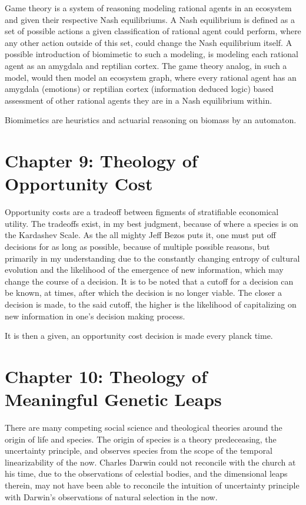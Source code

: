 \documentclass[ebook,12pt,oneside,openany]{memoir}
\begin{document}
\indent Game theory is a system of reasoning modeling rational agents in an ecosystem and given their respective Nash equilibriums. A Nash equilibrium is defined as a set of possible actions a given classification of rational agent could perform, where any other action outside of this set, could change the Nash equilibrium itself. A possible introduction of biomimetic to such a modeling, is modeling each rational agent as an amygdala and reptilian cortex. The game theory analog, in such a model, would then model an ecosystem graph, where every rational agent has an amygdala (emotions) or reptilian cortex (information deduced logic) based assessment of other rational agents they are in a Nash equilibrium within.

\indent Biomimetics are heuristics and actuarial reasoning on biomass by an automaton.
\chapter*{Chapter 9: Theology of Opportunity Cost}


\indent \indent Opportunity costs are a tradeoff between figments of stratifiable economical utility. The tradeoffs exist, in my best judgment, because of where a species is on the Kardashev Scale. As the all mighty Jeff Bezos puts it, one must put off decisions for as long as possible, because of multiple possible reasons, but primarily in my understanding due to the constantly changing entropy of cultural evolution and the likelihood of the emergence of new information, which may change the course of a decision. It is to be noted that a cutoff for a decision can be known, at times, after which the decision is no longer viable. The closer a decision is made, to the said cutoff, the higher is the likelihood of capitalizing on new information in one's decision making process.

\indent It is then a given, an opportunity cost decision is made every planck time.
\chapter*{Chapter 10: Theology of Meaningful Genetic Leaps}


\indent \indent There are many competing social science and theological theories around the origin of life and species. The origin of species is a theory predeceasing, the uncertainty principle, and observes species from the scope of the temporal linearizability of the now. Charles Darwin could not reconcile with the church at his time, due to the observations of celestial bodies, and the dimensional leaps therein, may not have been able to reconcile the intuition of uncertainty principle with Darwin’s observations of natural selection in the now.
\end{document}
